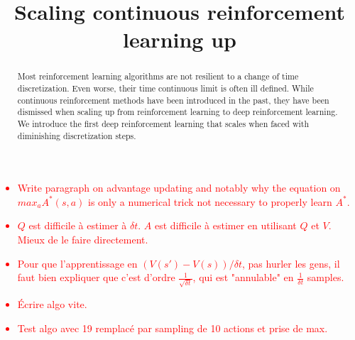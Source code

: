 \documentclass[11pt]{article}
\title{Scaling continuous reinforcement learning up}
\newcommand{\deltat}{{\delta t}}
\newcommand{\TODO}[1]{\textcolor{red}{#1}}
\begin{document}
\maketitle
\begin{abstract}
	Most reinforcement learning algorithms are not resilient to a change of
	time discretization. Even worse, their time continuous limit is often
	ill defined.  While continuous reinforcement methods have been
	introduced in the past, they have been dismissed when scaling up from
	reinforcement learning to deep reinforcement learning. We introduce the
	first deep reinforcement learning that scales when faced with
	diminishing discretization steps.
\end{abstract}
\TODO{
	\begin{itemize}
		\item Write paragraph on advantage updating and notably why the equation on
			$max_a A^*(s, a)$ is only a numerical trick not necessary to properly learn
			$A^*$.
		\item $Q$ est difficile à estimer à $\deltat$. $A$ est difficile à estimer en utilisant $Q$ et $V$. Mieux de le faire directement.
		\item Pour que l'apprentissage en $(V(s') - V(s)) / \deltat$, pas hurler les gens, il faut bien expliquer que c'est d'ordre $\frac{1}{\sqrt{\deltat}}$, qui est "annulable" en $\frac{1}{\deltat}$ samples.
		\item \'Ecrire algo vite.
		\item Test algo avec 19 remplacé par sampling de 10 actions et prise de max.
	\end{itemize}
}
\end{document}
